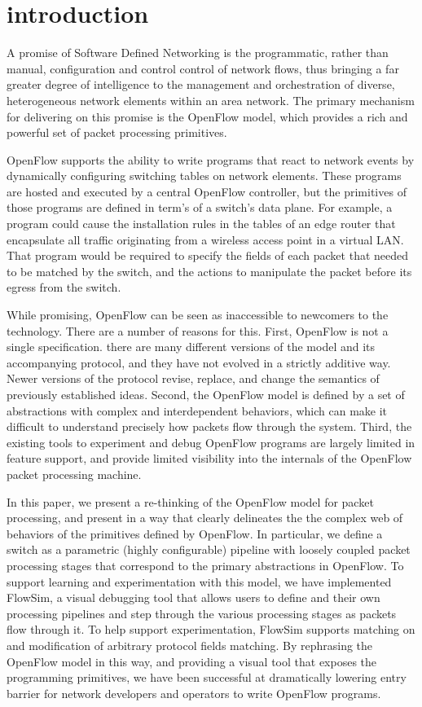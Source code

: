 
\section{introduction}
\label{sec:ref}

A promise of Software Defined Networking is the programmatic, rather
than manual, configuration and control control of network flows, thus
bringing a far greater degree of intelligence to the management and
orchestration of diverse, heterogeneous network elements within an
area network. The primary mechanism for delivering on this promise is
the OpenFlow model, which provides a rich and powerful set of packet 
processing primitives.


OpenFlow supports the ability to write programs that react to
network events by dynamically configuring switching tables on
network elements. These programs are hosted and executed by a central
OpenFlow controller, but the primitives of those programs are
defined in term's of a switch's data plane. For example, a program
could cause the installation rules in the tables of an edge router
that encapsulate all traffic originating from a wireless access
point in a virtual LAN. That program would be required to specify
the fields of each packet that needed to be matched by the switch, and 
the actions to manipulate the packet before its egress from the
switch.

While promising, OpenFlow can be seen as inaccessible to newcomers to the 
technology. There are a number of reasons for this.
First, OpenFlow is not a single specification. there are many different
versions of the model and its accompanying protocol, and they have not
evolved in a strictly additive way. Newer versions of the protocol revise,
replace, and change the semantics of previously established ideas.
Second, the OpenFlow model is defined by a set of abstractions with
complex and interdependent behaviors, which can make it difficult to 
understand precisely how packets flow through the system.
Third, the existing tools to experiment and debug OpenFlow programs are 
largely limited in feature support, and provide limited visibility into the 
internals of the OpenFlow packet processing machine.

In this paper, we present a re-thinking of the OpenFlow model for
packet processing, and present in a way that clearly delineates the
the complex web of behaviors of the primitives defined by OpenFlow.
In particular, we define a switch as a parametric (highly configurable)
pipeline with loosely coupled packet processing stages that correspond
to the primary abstractions in OpenFlow.
To support learning and experimentation with this model, we have 
implemented FlowSim, a visual debugging tool that allows users to
define and their own processing pipelines and step through the
various processing stages as packets flow through it. To help support
experimentation, FlowSim supports matching on and modification of arbitrary 
protocol fields matching.
By rephrasing the OpenFlow model in this way, and providing a visual
tool that exposes the programming primitives, we have been successful
at dramatically lowering entry barrier for network developers and
operators to write OpenFlow programs.

